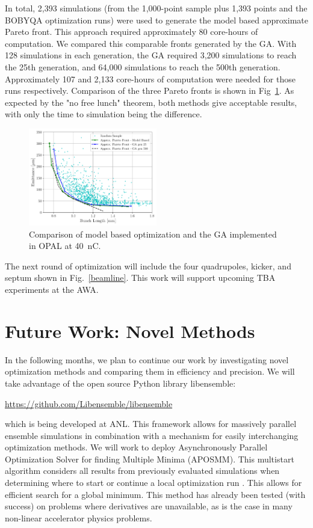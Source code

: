 \documentclass[letterpaper,  %
              ]{jacow-2_3}   %
\begin{document}
In total, 2,393 simulations (from the 1,000-point sample plus 
1,393 points and the BOBYQA optimization runs) were used to
generate the model based approximate Pareto front. 
This approach required approximately 80 core-hours of computation. 
We compared this comparable fronts generated by the GA.
With 128 simulations in each generation, the GA required 3,200
simulations to reach the 25th generation, and 64,000 simulations
to reach the 500th generation. Approximately 107 and 2,133 
core-hours of computation were needed for those runs respectively. 
Comparison of the three Pareto fronts is shown in Fig~\ref{compare}.
As expected by the "no free lunch" theorem, both methods give 
acceptable results, with only the time to simulation being 
the difference. 
\begin{figure}
	\includegraphics[width=0.5\textwidth]{model_vs_ga}
	\caption{Comparison of model based optimization and the GA implemented in OPAL at \SI{40}{nC}. }
	\label{compare}
\end{figure}

The next round of optimization will include the four quadrupoles, 
kicker, and septum shown in Fig.~\ref{beamline}. This work 
will support upcoming TBA experiments at the AWA.

\section{Future Work: Novel Methods}
In the following months, we plan to continue our work 
by investigating novel optimization methods and comparing them 
in efficiency and precision. We will take advantage of the 
open source Python library libensemble:
\begin{center}
	\url{https://github.com/Libensemble/libensemble}
\end{center} 
which is being developed at ANL.
This framework allows for massively parallel ensemble simulations in 
combination with a mechanism for easily interchanging optimization methods. 
We will work to deploy Asynchronously Parallel Optimization Solver for finding Multiple Minima (APOSMM).
This multistart algorithm considers all results from previously evaluated simulations when determining where to start or continue a local optimization run \cite{jeff}. This allows for efficient 
search for a global minimum. This method has already been tested
(with success) on problems where derivatives are unavailable, 
as is the case in many non-linear accelerator physics problems. 
\end{document}
